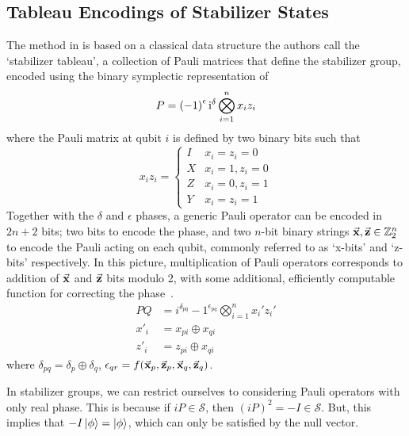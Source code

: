 \subsection{Tableau Encodings of Stabilizer States}\label{sec:sympencoding}
The method in \cite{Aaronson2004} is based on a classical data structure the authors call the `stabilizer tableau', a collection of Pauli matrices that define the stabilizer group, encoded using the binary symplectic representation of \cite{Dehaene2003}
\begin{equation} P = \left(-1\right)^{\epsilon} \mathrm{i}^{\delta}\bigotimes_{i=1}^{n} x_{i}z_{i}\end{equation}
where the Pauli matrix at qubit $i$ is defined by two binary bits such that
\begin{equation}
    x_{i}z_{i} = \begin{cases}
    I & x_{i}=z_{i}=0\\
    X & x_{i}=1, z_{i}=0 \\ 
    Z  &x_{i}=0, z_{i}=1 \\
    Y  &x_{i}=z_{i}=1
    \end{cases}
\end{equation}
Together with the $\delta$ and $\epsilon$ phases, a generic Pauli operator can be encoded in $2n+2$ bits; two bits to encode the phase, and two $n$-bit binary strings $\va{x},\va{z}\in\mathbb{Z}_{2}^{n}$ to encode the Pauli acting on each qubit, commonly referred to as `x-bits' and `z-bits' respectively. In this picture, multiplication of Pauli operators corresponds to addition of $\va{x}$ and $\va{z}$ bits modulo 2, with some additional, efficiently computable function for correcting the phase~\cite{Dehaene2003}.
\begin{align}
    P Q &= i^{\delta_{pq}}-1^{\epsilon_{pq}}\bigotimes_{i=1}^{n}x_{i}' z_{i}' \\
    x'_{i} &= x_{pi}\oplus x_{qi} \\
    z'_{i} &= z_{pi} \oplus x_{qi}
\end{align}
where $\delta_{pq} = \delta_{p}\oplus \delta_{q}$, $\epsilon_{qr} = f(\va{x}_{p}, \va{z}_{p}, \va{x}_{q}, \va{z}_{q})$.\par
In stabilizer groups, we can restrict ourselves to considering Pauli operators with only real phase. This is because if $iP\in\mathcal{S}$, then $(iP)^{2}=-I\in\mathcal{S}$. But, this implies that $-I\ket{\phi}=\ket{\phi}$, which can only be satisfied by the null vector.\par
